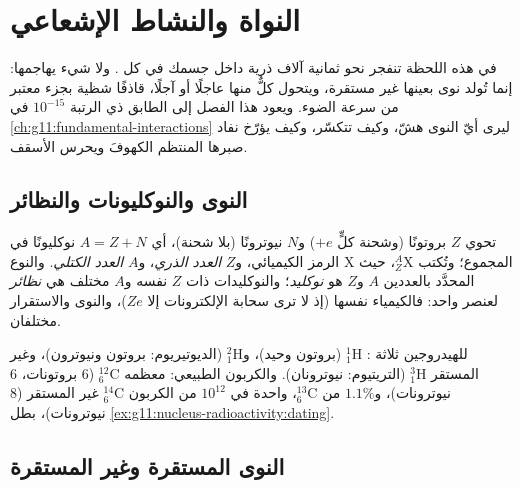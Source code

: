 \chapter{النواة والنشاط الإشعاعي}\label{ch:g11:nucleus-radioactivity}

في هذه اللحظة تنفجر نحو ثمانية آلاف  ذرية داخل جسمك في كل
. ولا شيء يهاجمها: إنما تُولد نوى بعينها غير مستقرة، ويتحول كلٌّ
منها عاجلًا أو آجلًا، قاذفًا شظية بجزء معتبر من
سرعة الضوء. ويعود هذا الفصل إلى الطابق ذي الرتبة $10^{-15}$  في
\cref{ch:g11:fundamental-interactions} ليرى أيّ النوى هشّ، وكيف
تتكسّر، وكيف يؤرّخ نفاد صبرها المنتظم الكهوفَ ويحرس الأسقف.

\section{النوى والنوكليونات والنظائر}

\begin{definition}\label{def:g11:nucleus-radioactivity:notation}
تحوي  $Z$ بروتونًا (وشحنة كلٍّ $+e$) و$N$ نيوترونًا (بلا
شحنة)، أي $A = Z + N$ نوكليونًا في المجموع؛ وتُكتب ${}^{A}_{Z}\mathrm{X}$،
حيث $\mathrm X$ الرمز الكيميائي، و$Z$ \emph{العدد
الذري}، و$A$ \emph{العدد الكتلي}. والنوع المحدَّد بالعددين $A$ و$Z$ هو \emph{نوكليد}؛
والنوكليدات ذات $Z$ نفسه و$A$ مختلف هي \emph{نظائر}
لعنصر واحد: فالكيمياء نفسها (إذ لا ترى سحابة الإلكترونات إلا $Ze$)،
والنوى والاستقرار مختلفان.
\end{definition}

\begin{example}\label{ex:g11:nucleus-radioactivity:hc}
للهيدروجين ثلاثة : ${}^{1}_{1}\mathrm{H}$ (بروتون وحيد)،
و${}^{2}_{1}\mathrm{H}$ (الديوتيريوم: بروتون ونيوترون)، وغير المستقر
${}^{3}_{1}\mathrm{H}$ (التريتيوم: نيوترونان). والكربون الطبيعي: معظمه
${}^{12}_{6}\mathrm{C}$ ($6$ بروتونات، $6$ نيوترونات)، و$1.1\%$ من
${}^{13}_{6}\mathrm{C}$،  واحدة في $10^{12}$ من الكربون
${}^{14}_{6}\mathrm{C}$ غير المستقر ($8$ نيوترونات)، بطل \cref{ex:g11:nucleus-radioactivity:dating}.
\end{example}

\section{النوى المستقرة وغير المستقرة}

